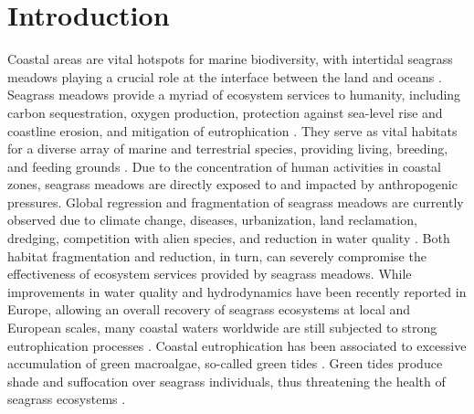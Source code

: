 \documentclass[
  number]{elsarticle}
\begin{document}
\section{Introduction}\label{introduction}

Coastal areas are vital hotspots for marine biodiversity, with
intertidal seagrass meadows playing a crucial role at the interface
between the land and oceans \citep{unsworth2022}. Seagrass meadows
provide a myriad of ecosystem services to humanity, including carbon
sequestration, oxygen production, protection against sea-level rise and
coastline erosion, and mitigation of eutrophication \citetext{\citealp[
]{unsworth2022}; \citealp{sousa2019blue}}. They serve as vital habitats
for a diverse array of marine and terrestrial species, providing living,
breeding, and feeding grounds \citetext{\citealp[
]{gardner2018}; \citealp[ ]{Zoffoli2022}; \citealp{jankowska2019}}. Due
to the concentration of human activities in coastal zones, seagrass
meadows are directly exposed to and impacted by anthropogenic pressures.
Global regression and fragmentation of seagrass meadows are currently
observed due to climate change, diseases, urbanization, land
reclamation, dredging, competition with alien species, and reduction in
water quality \citetext{\citealp[ ]{nguyen2021}; \citealp[
]{soissons2018}; \citealp[ ]{orth2006}; \citealp[ ]{lin2018}; \citealp[
]{duffy2019}; \citealp[ ]{rasheed2011long}; \citealp[
]{chefaoui2018dramatic}; \citealp{sousa2019blue}}. Both habitat
fragmentation and reduction, in turn, can severely compromise the
effectiveness of ecosystem services provided by seagrass meadows. While
improvements in water quality and hydrodynamics have been recently
reported in Europe, allowing an overall recovery of seagrass ecosystems
at local and European scales, many coastal waters worldwide are still
subjected to strong eutrophication processes \citetext{\citealp[
]{deSantos2019}; \citealp[ ]{Zoffoli2021}; \citealp{sousa2019blue}}.
Coastal eutrophication has been associated to excessive accumulation of
green macroalgae, so-called green tides \citep{devlin2023nutrients}.
Green tides produce shade and suffocation over seagrass individuals,
thus threatening the health of seagrass ecosystems \citep{wang2022}.
\end{document}
